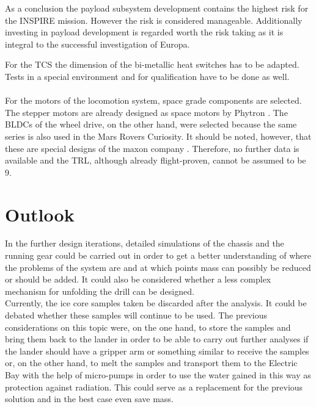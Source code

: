 As a conclusion the payload subsystem development contains the highest risk for the INSPIRE mission. However the risk is considered manageable. Additionally investing in payload development is regarded worth the risk taking as it is integral to the successful investigation of Europa.

For the TCS the dimension of the  bi-metallic heat switches has to be adapted.
Tests in a special environment and for qualification have to be done as well. \\ \\
For the motors of the locomotion system, space grade components are selected. The stepper motors are already designed as space motors by Phytron \cite{Phytron}. The BLDCs of the wheel drive, on the other hand, were selected because the same series is also used in the Mars Rovers Curiosity. It should be noted, however, that these are special designs of the maxon company \cite{Maxon}. Therefore, no further data is available and the TRL, although already flight-proven, cannot be assumed to be 9. 

\clearpage

\section{Outlook}
\label{sec:Outlook}

In the further design iterations, detailed simulations of the chassis and the running gear could be carried out in order to get a better understanding of where the problems of the system are and at which points mass can possibly be reduced or should be added. It could also be considered whether a less complex mechanism for unfolding the drill can be designed. \\

Currently, the ice core samples taken be discarded after the analysis. It could be debated whether these samples will continue to be used. The previous considerations on this topic were, on the one hand, to store the samples and bring them back to the lander in order to be able to carry out further analyses if the lander should have a gripper arm or something similar to receive the samples or, on the other hand, to melt the samples and transport them to the Electric Bay with the help of micro-pumps in order to use the water gained in this way as protection against radiation. This could serve as a replacement for the previous solution and in the best case even save mass. \\

